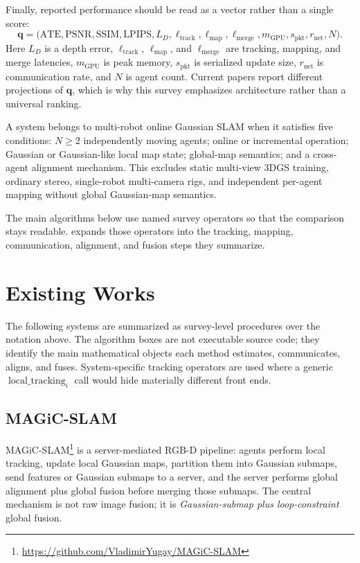 \documentclass[11pt, a4paper, logo]{googledeepmind}
\newcommand{\targetclass}{multi-robot online Gaussian SLAM}
\begin{document}
Finally, reported performance should be read as a vector rather than a single score:
\[
\mathbf{q}=\bigl(\mathrm{ATE},\mathrm{PSNR},\mathrm{SSIM},\mathrm{LPIPS},L_D,
\ell_{\mathrm{track}},\ell_{\mathrm{map}},\ell_{\mathrm{merge}},m_{\mathrm{GPU}},s_{\mathrm{pkt}},r_{\mathrm{net}},N\bigr).
\]
Here $L_D$ is a depth error, $\ell_{\mathrm{track}}$, $\ell_{\mathrm{map}}$, and $\ell_{\mathrm{merge}}$ are tracking, mapping, and merge latencies, $m_{\mathrm{GPU}}$ is peak memory, $s_{\mathrm{pkt}}$ is serialized update size, $r_{\mathrm{net}}$ is communication rate, and $N$ is agent count. Current papers report different projections of $\mathbf{q}$, which is why this survey emphasizes architecture rather than a universal ranking.

A system belongs to \targetclass{} when it satisfies five conditions: $N\geq2$ independently moving agents; online or incremental operation; Gaussian or Gaussian-like local map state; global-map semantics; and a cross-agent alignment mechanism. This excludes static multi-view 3DGS training, ordinary stereo, single-robot multi-camera rigs, and independent per-agent mapping without global Gaussian-map semantics.

The main algorithms below use named survey operators so that the comparison stays readable.  expands those operators into the tracking, mapping, communication, alignment, and fusion steps they summarize.

\section{Existing Works}

The following systems are summarized as survey-level procedures over the notation above. The algorithm boxes are not executable source code; they identify the main mathematical objects each method estimates, communicates, aligns, and fuses. System-specific tracking operators are used where a generic $\operatorname{local\_tracking}_i$ call would hide materially different front ends.

\subsection{MAGiC-SLAM}
\label{sec:systems:magic-slam}

MAGiC-SLAM\footnote{\url{https://github.com/VladimirYugay/MAGiC-SLAM}} \citep{yugay2025magic_slam} is a server-mediated RGB-D pipeline: agents perform local tracking, update local Gaussian maps, partition them into Gaussian submaps, send features or Gaussian submaps to a server, and the server performs global alignment plus global fusion before merging those submaps. The central mechanism is not raw image fusion; it is \emph{Gaussian-submap plus loop-constraint} global fusion.
\end{document}
